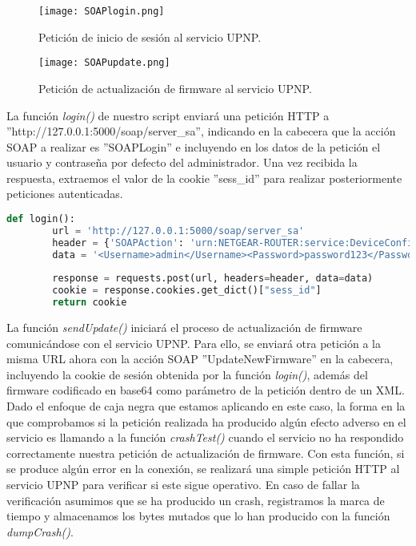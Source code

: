 \begin{figure}[H]
    \centering
    \texttt{[image: SOAPlogin.png]}
    \caption{Petición de inicio de sesión al servicio UPNP.}
    \label{fig:SOAPlogin}
\end{figure}

\begin{figure}[H]
    \centering
    \texttt{[image: SOAPupdate.png]}
    \caption{Petición de actualización de firmware al servicio UPNP.}
    \label{fig:SOAPupdate}
\end{figure}

La función \textit{login()} de nuestro script enviará una petición HTTP a ''http://127.0.0.1:5000/soap/server\_sa'', indicando en la cabecera que la acción SOAP a realizar es ''SOAPLogin''
e incluyendo en los datos de la petición el usuario y contraseña por defecto del administrador. Una vez 
recibida la respuesta, extraemos el valor de la cookie ''sess\_id'' para realizar posteriormente peticiones
autenticadas.

\begin{lstlisting}[language=python, caption=Función para iniciar sesión en el servicio UPNP., captionpos=b,
    frame=single, breaklines, showstringspaces=false]
    def login():
        url = 'http://127.0.0.1:5000/soap/server_sa'
        header = {'SOAPAction': 'urn:NETGEAR-ROUTER:service:DeviceConfig:1#SOAPLogin'}
        data = '<Username>admin</Username><Password>password123</Password>'
        
        response = requests.post(url, headers=header, data=data)
        cookie = response.cookies.get_dict()["sess_id"]
        return cookie
\end{lstlisting}

La función \textit{sendUpdate()} iniciará el proceso de actualización de firmware comunicándose con el servicio UPNP. Para ello, se enviará otra petición a la misma URL ahora con la acción SOAP ''UpdateNewFirmware'' en la cabecera,
incluyendo la cookie de sesión obtenida por la función \textit{login()}, además del firmware codificado en base64 como parámetro 
de la petición dentro de un XML. Dado el enfoque de caja negra que estamos aplicando en este caso, la forma en la que comprobamos 
si la petición realizada ha producido algún efecto adverso en el servicio es llamando a la función \textit{crashTest()}
cuando el servicio no ha respondido correctamente nuestra petición de actualización de firmware. Con esta función, si se produce algún error
en la conexión, se realizará una simple petición HTTP al servicio UPNP para verificar si este sigue operativo. En caso de fallar la 
verificación asumimos que se ha producido un crash, registramos la marca de tiempo y almacenamos los bytes mutados que lo han producido con la función
\textit{dumpCrash()}.

